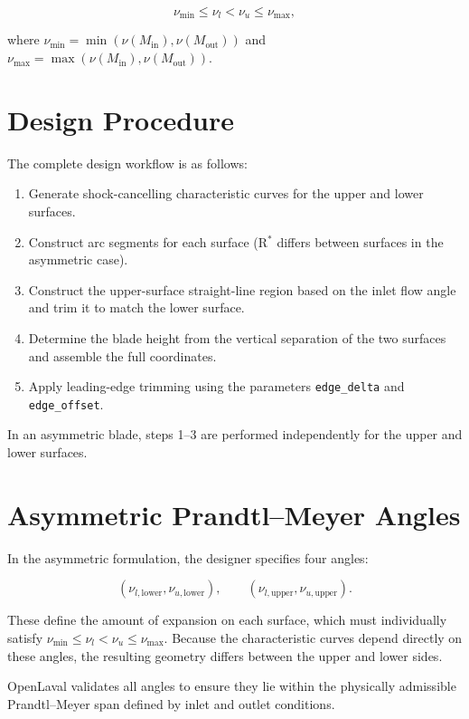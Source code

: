 \[
\nu_{\min} \le \nu_l < \nu_u \le \nu_{\max},
\]


where $\nu_{\min} = \min(\nu(M_{\mathrm{in}}), \nu(M_{\mathrm{out}}))$ and 
$\nu_{\max} = \max(\nu(M_{\mathrm{in}}), \nu(M_{\mathrm{out}}))$.

\section{Design Procedure}

The complete design workflow is as follows:

\begin{enumerate}
  \item Generate shock-cancelling characteristic curves for the upper and lower surfaces.
  \item Construct arc segments for each surface (R$^\ast$ differs between surfaces in the asymmetric case).
  \item Construct the upper-surface straight-line region based on the inlet flow angle and trim it to match the lower surface.
  \item Determine the blade height from the vertical separation of the two surfaces and assemble the full coordinates.
  \item Apply leading-edge trimming using the parameters \texttt{edge\_delta} and \texttt{edge\_offset}.
\end{enumerate}

In an asymmetric blade, steps 1–3 are performed independently for the upper and lower surfaces.

\section{Asymmetric Prandtl–Meyer Angles}

In the asymmetric formulation, the designer specifies four angles:


\[
(\nu_{l,\mathrm{lower}}, \nu_{u,\mathrm{lower}}), \qquad
(\nu_{l,\mathrm{upper}}, \nu_{u,\mathrm{upper}}).
\]



These define the amount of expansion on each surface, which must individually satisfy 
$\nu_{\min} \le \nu_{l} < \nu_{u} \le \nu_{\max}$.
Because the characteristic curves depend directly on these angles,
the resulting geometry differs between the upper and lower sides.

OpenLaval validates all angles to ensure they lie within the physically
admissible Prandtl–Meyer span defined by inlet and outlet conditions.

